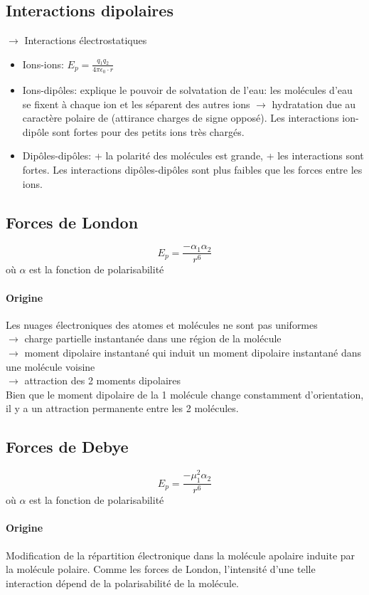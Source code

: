 \subsection{Interactions dipolaires}
$\rightarrow$ Interactions électrostatiques
\begin{itemize}
	\item Ions-ions: $E_p=\frac{q_1q_2}{4\pi\epsilon_0\cdot r}$
	\item Ions-dipôles: explique le pouvoir de solvatation de l'eau: les molécules d'eau se fixent à chaque ion et les séparent des autres ions $\rightarrow$ hydratation due au caractère polaire de  (attirance charges de signe opposé).
		Les interactions ion-dipôle sont fortes pour des petits ions très chargés.
	\item Dipôles-dipôles: + la polarité des molécules est grande, + les interactions sont fortes.
		Les interactions dipôles-dipôles sont plus faibles que les forces entre les ions.
\end{itemize}

\subsection{Forces de London}
\[ E_p = \frac{-\alpha_1 \alpha_2}{r^6} \]
où $\alpha$ est la fonction de polarisabilité

\paragraph{Origine}
Les nuages électroniques des atomes et molécules ne sont pas uniformes\\ $\rightarrow$ charge partielle instantanée dans une région de la molécule\\ $\rightarrow$ moment dipolaire instantané qui induit un moment dipolaire instantané dans une molécule voisine\\ $\rightarrow$ attraction des 2 moments dipolaires\\
Bien que le moment dipolaire de la 1 molécule change constamment d'orientation, il y a un attraction permanente entre les 2 molécules.

\subsection{Forces de Debye}
\[ E_p = \frac{-\mu_1^2 \alpha_2}{r^6} \]
où $\alpha$ est la fonction de polarisabilité

\paragraph{Origine}
Modification de la répartition électronique dans la molécule apolaire induite par la molécule polaire.
Comme les forces de London, l'intensité d'une telle interaction dépend de la polarisabilité de la molécule.

